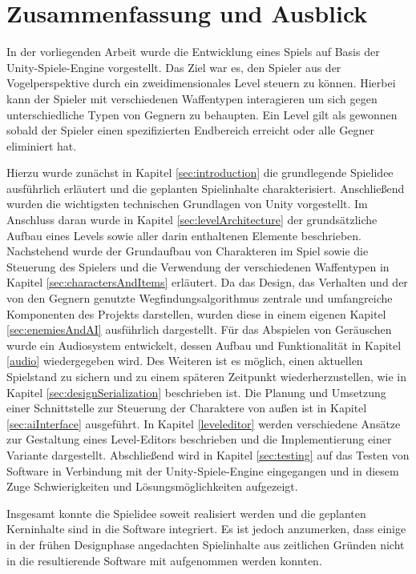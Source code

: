 \section{Zusammenfassung und Ausblick}\label{sec:conclusion}

In der vorliegenden Arbeit wurde die Entwicklung eines Spiels auf Basis der Unity-Spiele-Engine vorgestellt. Das Ziel war es, den Spieler aus der Vogelperspektive durch ein zweidimensionales Level steuern zu können. Hierbei kann der Spieler mit verschiedenen Waffentypen interagieren um sich gegen unterschiedliche Typen von Gegnern zu behaupten. Ein Level gilt als gewonnen sobald der Spieler einen spezifizierten Endbereich erreicht oder alle Gegner eliminiert hat. 

Hierzu wurde zunächst in Kapitel \ref{sec:introduction} die grundlegende Spielidee ausführlich erläutert und die geplanten Spielinhalte charakterisiert. Anschließend wurden die wichtigsten technischen Grundlagen von Unity vorgestellt. Im Anschluss daran wurde in Kapitel \ref{sec:levelArchitecture} der grundsätzliche Aufbau eines Levels sowie aller darin enthaltenen Elemente beschrieben. Nachstehend wurde der Grundaufbau von Charakteren im Spiel sowie die Steuerung des Spielers und die Verwendung der verschiedenen Waffentypen in Kapitel \ref{sec:charactersAndItems} erläutert. Da das Design, das Verhalten und der von den Gegnern genutzte Wegfindungsalgorithmus zentrale und umfangreiche Komponenten des Projekts darstellen, wurden diese in einem eigenen Kapitel \ref{sec:enemiesAndAI} ausführlich dargestellt. Für das Abspielen von Geräuschen wurde ein Audiosystem entwickelt, dessen Aufbau und Funktionalität in Kapitel \ref{audio} wiedergegeben wird. Des Weiteren ist es möglich, einen aktuellen Spielstand zu sichern und zu einem späteren Zeitpunkt wiederherzustellen, wie in Kapitel \ref{sec:designSerialization} beschrieben ist. Die Planung und Umsetzung einer Schnittstelle zur Steuerung der Charaktere von außen ist in Kapitel \ref{sec:aiInterface} ausgeführt. In Kapitel \ref{leveleditor} werden verschiedene Ansätze zur Gestaltung eines Level-Editors beschrieben und die Implementierung einer Variante dargestellt. Abschließend wird in Kapitel \ref{sec:testing} auf das Testen von Software in Verbindung mit der Unity-Spiele-Engine eingegangen und in diesem Zuge Schwierigkeiten und Lösungsmöglichkeiten aufgezeigt. 

Insgesamt konnte die Spielidee soweit realisiert werden und die geplanten Kerninhalte sind in die Software integriert. Es ist jedoch anzumerken, dass einige in der frühen Designphase angedachten Spielinhalte aus zeitlichen Gründen nicht in die resultierende Software mit aufgenommen werden konnten. 

